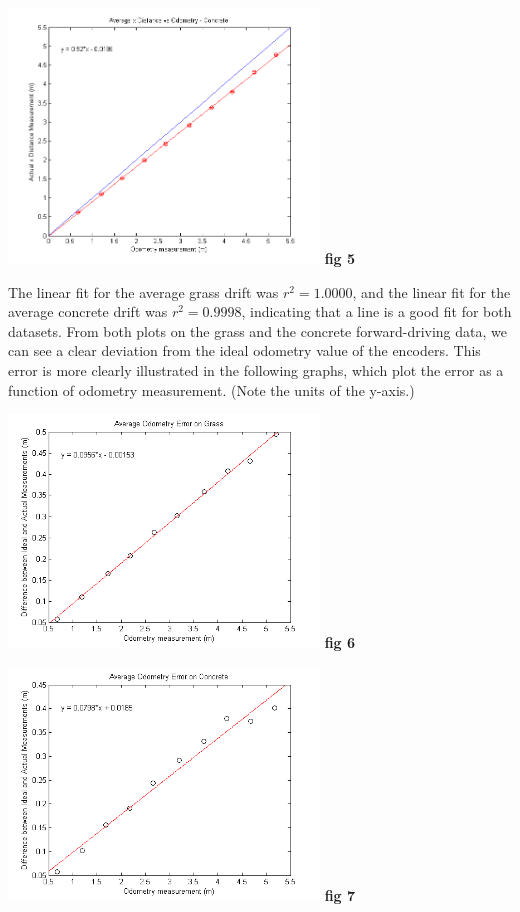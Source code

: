 \documentclass[conference]{IEEEtran}
\begin{document}
\includegraphics[width = 3.25in]{concrete_avg.png}
\textbf{fig 5}

The linear fit for the average grass drift was $r^2 = 1.0000$, and the linear fit for 
the average concrete drift was $r^2 = 0.9998$, indicating that a line is a good fit 
for both datasets.  
From both plots on the grass and the concrete forward-driving data, we can 
see a clear deviation from the ideal odometry value of the encoders.  This 
error is more clearly illustrated in the following graphs, which plot the error
 as a function of odometry measurement.  (Note 
the units of the y-axis.)  


\includegraphics[width=3.25in]{grass_error.png}
\textbf{fig 6}


\includegraphics[width=3.25in]{concrete_error.png}
\textbf{fig 7}
\end{document}
